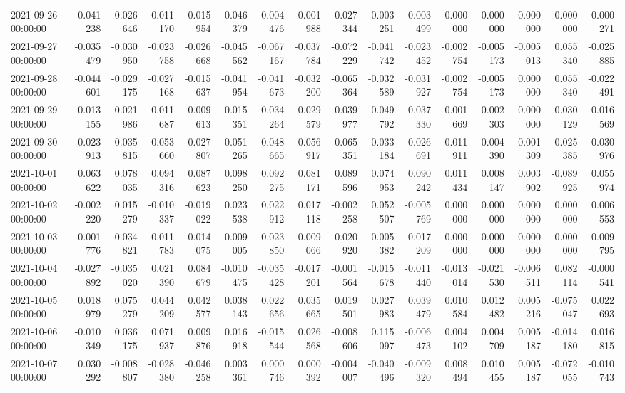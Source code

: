 \begin{tabular}{lrrrrrrrrrrrrrrr}
2021-09-26 00:00:00 & -0.041238 & -0.026646 & 0.011170 & -0.015954 & 0.046379 & 0.004476 & -0.001988 & 0.027344 & -0.003251 & 0.003499 & 0.000000 & 0.000000 & 0.000000 & 0.000000 & 0.000271 \\
2021-09-27 00:00:00 & -0.035479 & -0.030950 & -0.023758 & -0.026668 & -0.045562 & -0.067167 & -0.037784 & -0.072229 & -0.041742 & -0.023452 & -0.002754 & -0.005173 & -0.005013 & 0.055340 & -0.025885 \\
2021-09-28 00:00:00 & -0.044601 & -0.029175 & -0.027168 & -0.015637 & -0.041954 & -0.041673 & -0.032200 & -0.065364 & -0.032589 & -0.031927 & -0.002754 & -0.005173 & 0.000000 & 0.055340 & -0.022491 \\
2021-09-29 00:00:00 & 0.013155 & 0.021986 & 0.011687 & 0.009613 & 0.015351 & 0.034264 & 0.029579 & 0.039977 & 0.049792 & 0.037330 & 0.001669 & -0.002303 & 0.000000 & -0.030129 & 0.016569 \\
2021-09-30 00:00:00 & 0.023913 & 0.035815 & 0.053660 & 0.027807 & 0.051265 & 0.048665 & 0.056917 & 0.065351 & 0.033184 & 0.026691 & -0.011911 & -0.004390 & 0.001309 & 0.025385 & 0.030976 \\
2021-10-01 00:00:00 & 0.063622 & 0.078035 & 0.094316 & 0.087623 & 0.098250 & 0.092275 & 0.081171 & 0.089596 & 0.074953 & 0.090242 & 0.011434 & 0.008147 & 0.003902 & -0.089925 & 0.055974 \\
2021-10-02 00:00:00 & -0.002220 & 0.015279 & -0.010337 & -0.019022 & 0.023538 & 0.022912 & 0.017118 & -0.002258 & 0.052507 & -0.005769 & 0.000000 & 0.000000 & 0.000000 & 0.000000 & 0.006553 \\
2021-10-03 00:00:00 & 0.001776 & 0.034821 & 0.011783 & 0.014075 & 0.009005 & 0.023850 & 0.009066 & 0.020920 & -0.005382 & 0.017209 & 0.000000 & 0.000000 & 0.000000 & 0.000000 & 0.009795 \\
2021-10-04 00:00:00 & -0.027892 & -0.035020 & 0.021390 & 0.084679 & -0.010475 & -0.035428 & -0.017201 & -0.001564 & -0.015678 & -0.011440 & -0.013014 & -0.021530 & -0.006511 & 0.082114 & -0.000541 \\
2021-10-05 00:00:00 & 0.018979 & 0.075279 & 0.044209 & 0.042577 & 0.038143 & 0.022656 & 0.035665 & 0.019501 & 0.027983 & 0.039479 & 0.010584 & 0.012482 & 0.005216 & -0.075047 & 0.022693 \\
2021-10-06 00:00:00 & -0.010349 & 0.036175 & 0.071937 & 0.009876 & 0.016918 & -0.015544 & 0.026568 & -0.008606 & 0.115097 & -0.006473 & 0.004102 & 0.004709 & 0.005187 & -0.014180 & 0.016815 \\
2021-10-07 00:00:00 & 0.030292 & -0.008807 & -0.028380 & -0.046258 & 0.003361 & 0.000746 & 0.000392 & -0.004007 & -0.040496 & -0.009320 & 0.008494 & 0.010455 & 0.005187 & -0.072055 & -0.010743 \\

\end{tabular}
